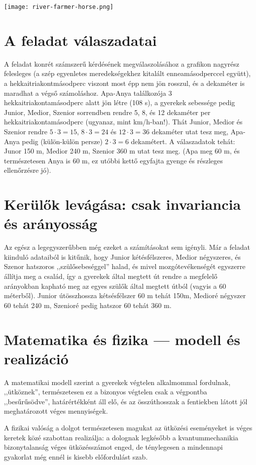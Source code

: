 \documentclass{article}
\begin{document}
	\texttt{[image: river-farmer-horse.png]}

	\section{A feladat válaszadatai}

	A feladat konrét számszerű kérdésének megválaszolásához  a grafikon nagyrész felesleges (a szép egyenletes meredekségekhez kitalált enneamásodperccel együtt), a hekkaitriakontmásodperc viszont most épp nem jön rosszul, és a dekaméter is maradhat a végső számoláshoz. Apa-Anya találkozója 3 hekkaitriakontamásodperc alatt jön létre (108 s), a gyerekek sebessége pedig Junior, Medior, Szenior sorrendben rendre 5, 8, és 12 dekaméter per hekkai\-triakonta\-másodperc (ugyanaz, mint km/h-ban!). Thát Junior, Medior és Szenior rendre $5\cdot3 = 15$, $8\cdot3 = 24$ és $12\cdot3 = 36$ dekaméter utat tesz meg, Apa-Anya pedig (külön-külön persze) $2\cdot3 = 6$ dekamétert. A válaszadatok tehát: Junor 150 m, Medior  240 m, Szenior 360 m utat tesz meg. (Apa meg 60 m, és természetesen Anya is 60 m, ez utóbbi kettő egyfajta gyenge és részleges ellenőrzésre jó).

	\section{Kerülők levágása: csak invariancia és arányosság}

	Az egész a legegyszerűbben még ezeket a számításokat sem igényli. Már a feladat kiinduló adataiból is kitűnik, hogy Junior kétésfélszeres, Medior négyszeres, és Szenor hatszoros ,,szülősebeséggel'' halad, és mivel mozgótevékenségét egyszerre állítja meg a család, így a gyerekek által megtett út rendre a megfelelő arányokban kapható meg az egyes szülők által megtett útból (vagyis a 60 méterből). Junior útösszhossza kétsésfélszer 60 m tehát 150m, Medioré négyszer 60 tehát 240 m, Szenioré pedig hatszor 60 tehát 360 m.


	\section{Matematika és fizika --- modell és realizáció}

	A matematikai modell szerint a gyerekek végtelen alkalmommal fordulnak, ,,ütköznek'', természetesen ez a bizonyos végtelen csak a végpontba ,,besűrűsödve'', határértékként áll elő, és az összúthosszak a fentiekben látott jól meghatározott véges mennyiségek.

	A fizikai valóság a dolgot természetesen magukat az ütközési eseményeket is véges keretek közé szabottan realizálja: a dolognak legkésőbb a kvantummechanikia bizonytalanság véges ütközésszámot enged, de ténylegesen a mindennapi gyakorlat még ennél is kisebb előfordulást szab. 
\end{document}
